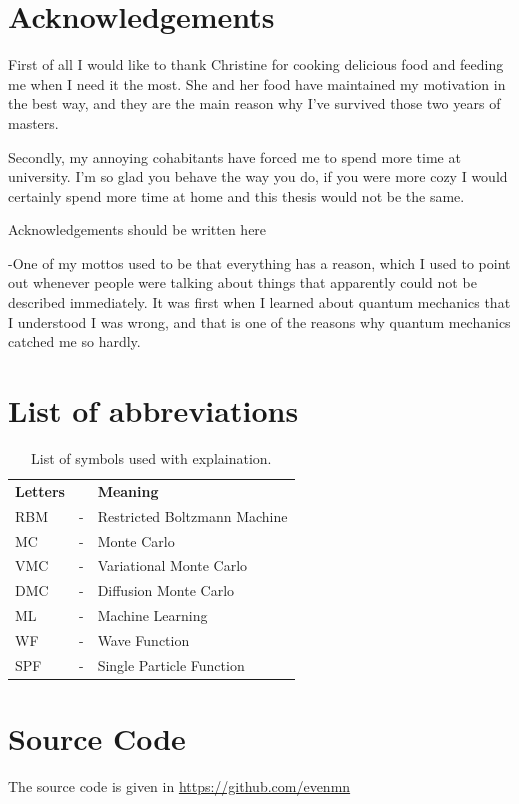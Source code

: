 \thispagestyle{empty}
\clearpage

\thispagestyle{empty}
\clearpage

\section*{Acknowledgements}
First of all I would like to thank Christine for cooking delicious food and feeding me when I need it the most. She and her food have maintained my motivation in the best way, and they are the main reason why I've survived those two years of masters. 

Secondly, my annoying cohabitants have forced me to spend more time at university. I'm so glad you behave the way you do, if you were more cozy I would certainly spend more time at home and this thesis would not be the same.
\vspace{10cm}

    Acknowledgements should be written here
    
    -One of my mottos used to be that everything has a reason, which I used to point out whenever people were talking about things that apparently could not be described immediately. It was first when I learned about quantum mechanics that I understood I was wrong, and that is one of the reasons why quantum mechanics catched me so hardly. 
    
\thispagestyle{empty}
\clearpage

{%
    \tableofcontents
    \thispagestyle{empty}
    \clearpage}%

\thispagestyle{empty}
\clearpage

\section*{List of abbreviations}
\begin{table}[H]
    \centering
    \begin{tabular}{lcl}
        \textbf{Letters} & & \textbf{Meaning} \\
        RBM & - & Restricted Boltzmann Machine \\
        MC & - & Monte Carlo \\
        VMC & - & Variational Monte Carlo \\
        DMC & - & Diffusion Monte Carlo \\
        ML & - & Machine Learning \\
        WF & - & Wave Function \\
        SPF & - & Single Particle Function \\

    \end{tabular}
    \caption{List of symbols used with explaination.}
    \label{tab:symbols}
\end{table}
\thispagestyle{empty}
\clearpage

\section*{Source Code}
    The source code is given in \url{https://github.com/evenmn}

\thispagestyle{empty}
\clearpage
